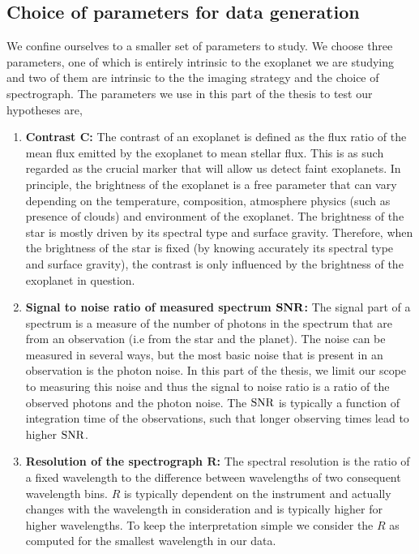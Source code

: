 \subsection{ Choice of parameters for data generation}
We confine ourselves to a smaller set of parameters to study.
We choose three parameters, one of which is entirely intrinsic to the exoplanet we are studying and two of them are intrinsic to the the imaging strategy and the choice of spectrograph.
The parameters we use in this part of the thesis to test our hypotheses are,
 \begin{enumerate}
     \item \textbf{Contrast $\mathbf{C}$:}
     The contrast of an exoplanet is defined as the flux ratio of the mean flux emitted by the exoplanet to mean stellar flux. 
     This is as such regarded as the crucial marker that will allow us detect faint exoplanets. 
     In principle, the brightness of the exoplanet is a free parameter that can vary depending on the temperature, composition, atmosphere physics (such as presence of clouds) and environment of the exoplanet. 
     The brightness of the star is mostly driven by its spectral type and surface gravity.
     Therefore, when the brightness of the star is fixed (by knowing accurately its spectral type and surface gravity), the contrast is only influenced by the brightness of the exoplanet in question.
     \item \textbf{Signal to noise ratio of measured spectrum $\rm{\mathbf{SNR}}$:}
     The signal part of a spectrum is a measure of the number of photons in the spectrum that are from an observation (i.e from the star and the planet).
     The noise can be measured in several ways, but the most basic noise that is present in an observation is the photon noise.
     In this part of the thesis, we limit our scope to measuring this noise and thus the signal to noise ratio is a ratio of the observed photons and the photon noise.
     The $\rm{SNR}$ is typically a function of integration time of the observations, such that longer observing times lead to higher $\rm{SNR}$.
     \item \textbf{Resolution of the spectrograph $\mathbf{R}$:}
     The spectral resolution is the ratio of a fixed wavelength to the difference between wavelengths of two consequent wavelength bins.
     $R$ is typically dependent on the instrument and actually changes with the wavelength in consideration and is typically higher for higher wavelengths.
     To keep the interpretation simple we consider the $R$ as computed for the smallest wavelength in our data.
 \end{enumerate}
